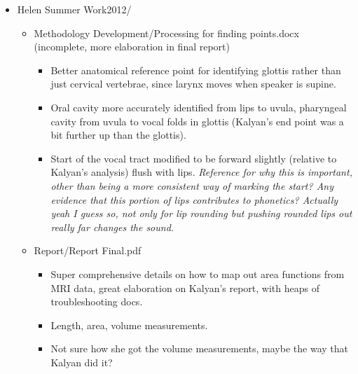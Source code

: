 \documentclass{article}
\begin{document}
\begin{itemize}
    \item Helen Summer Work2012/
    \begin{itemize}
        \item Methodology Development/Processing for finding points.docx (incomplete, more elaboration in final report)
        \begin{itemize}
            \item Better anatomical reference point for identifying glottis rather than just cervical vertebrae, since larynx moves when speaker is supine.
            \item Oral cavity more accurately identified from lips to uvula, pharyngeal cavity from uvula to vocal folds in glottis (Kalyan's end point was a bit further up than the glottis).
            \item Start of the vocal tract modified to be forward slightly (relative to Kalyan's analysis) flush with lips. \emph{Reference for why this is important, other than being a more consistent way of marking the start? Any evidence that this portion of lips contributes to phonetics? Actually yeah I guess so, not only for lip rounding but pushing rounded lips out really far changes the sound.}
        \end{itemize}
        \item Report/Report Final.pdf
        \begin{itemize}
            \item Super comprehensive details on how to map out area functions from MRI data, great elaboration on Kalyan's report, with heaps of troubleshooting docs.
            \item Length, area, volume measurements.
            \item Not sure how she got the volume measurements, maybe the way that Kalyan did it?
        \end{itemize}
    \end{itemize}
    

\end{itemize}
\end{document}

